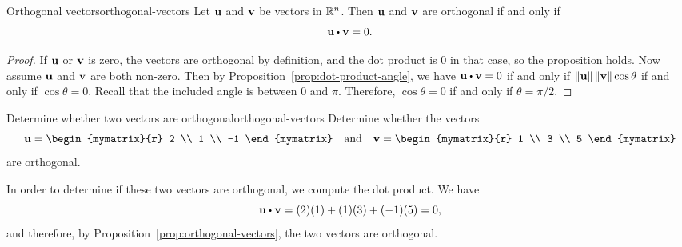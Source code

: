 \begin{proposition}{Orthogonal vectors}{orthogonal-vectors}
  Let $\mbox{\bf u}$ and $\mbox{\bf v}$ be vectors in $\mathbb{R}^n$. Then $\mbox{\bf u}$
  and $\mbox{\bf v}$ are orthogonal if and only
  if
  \begin{equation*}
    \vect{u} \dotprod \vect{v} = 0.
  \end{equation*}
\end{proposition}

\begin{proof}
  If $\mbox{\bf u}$ or $\mbox{\bf v}$ is zero, the vectors are orthogonal by
  definition, and the dot product is $0$ in that case, so the
  proposition holds. Now assume $\mbox{\bf u}$ and $\mbox{\bf v}$ are both
  non-zero.  Then by Proposition~\ref{prop:dot-product-angle}, we have
  $\vect{u} \dotprod \vect{v} = 0$ if and only if
  $\left\|\mbox{\bf u}\right\| \left\|\mbox{\bf v}\right\| \cos \theta$ if and only if
  $\cos\theta=0$. Recall that the included angle is between $0$ and
  $\pi$. Therefore, $\cos\theta=0$ if and only if $\theta=\pi/2$.
\end{proof}

\begin{example}{Determine whether two vectors are orthogonal}{orthogonal-vectors}
Determine whether the vectors
\begin{equation*}
\vect{u}=
\begin{mymatrix}{r}
2 \\
1 \\
-1
\end{mymatrix}
\quad\mbox{and}\quad
\vect{v}
=
\begin{mymatrix}{r}
1 \\
3 \\
5
\end{mymatrix}
\end{equation*}
are orthogonal.
\end{example}

\begin{solution}
  In order to determine if these two vectors are orthogonal, we
  compute the dot product. We have
  \begin{equation*}
    \vect{u} \dotprod \vect{v}
    =
    (2)(1) + (1)(3) + (-1)(5)
    =
    0,
  \end{equation*}
  and therefore, by Proposition~\ref{prop:orthogonal-vectors}, the two vectors are orthogonal.
\end{solution}
